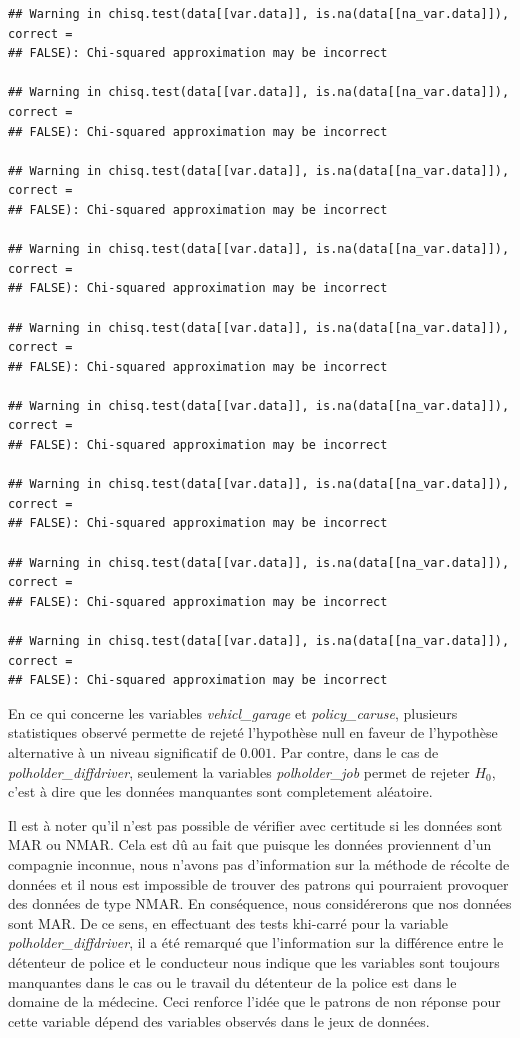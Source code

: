 \documentclass[
]{article}
\begin{document}
\begin{verbatim}
## Warning in chisq.test(data[[var.data]], is.na(data[[na_var.data]]), correct =
## FALSE): Chi-squared approximation may be incorrect

## Warning in chisq.test(data[[var.data]], is.na(data[[na_var.data]]), correct =
## FALSE): Chi-squared approximation may be incorrect

## Warning in chisq.test(data[[var.data]], is.na(data[[na_var.data]]), correct =
## FALSE): Chi-squared approximation may be incorrect

## Warning in chisq.test(data[[var.data]], is.na(data[[na_var.data]]), correct =
## FALSE): Chi-squared approximation may be incorrect

## Warning in chisq.test(data[[var.data]], is.na(data[[na_var.data]]), correct =
## FALSE): Chi-squared approximation may be incorrect

## Warning in chisq.test(data[[var.data]], is.na(data[[na_var.data]]), correct =
## FALSE): Chi-squared approximation may be incorrect

## Warning in chisq.test(data[[var.data]], is.na(data[[na_var.data]]), correct =
## FALSE): Chi-squared approximation may be incorrect

## Warning in chisq.test(data[[var.data]], is.na(data[[na_var.data]]), correct =
## FALSE): Chi-squared approximation may be incorrect

## Warning in chisq.test(data[[var.data]], is.na(data[[na_var.data]]), correct =
## FALSE): Chi-squared approximation may be incorrect
\end{verbatim}

En ce qui concerne les variables \emph{vehicl\_garage} et
\emph{policy\_caruse}, plusieurs statistiques observé permette de rejeté
l'hypothèse null en faveur de l'hypothèse alternative à un niveau
significatif de \(0.001%
\). Par contre, dans le cas de \emph{polholder\_diffdriver}, seulement
la variables \emph{polholder\_job} permet de rejeter \(H_0\), c'est à
dire que les données manquantes sont completement aléatoire.

Il est à noter qu'il n'est pas possible de vérifier avec certitude si
les données sont MAR ou NMAR. Cela est dû au fait que puisque les
données proviennent d'un compagnie inconnue, nous n'avons pas
d'information sur la méthode de récolte de données et il nous est
impossible de trouver des patrons qui pourraient provoquer des données
de type NMAR. En conséquence, nous considérerons que nos données sont
MAR. De ce sens, en effectuant des tests khi-carré pour la variable
\emph{polholder\_diffdriver}, il a été remarqué que l'information sur la
différence entre le détenteur de police et le conducteur nous indique
que les variables sont toujours manquantes dans le cas ou le travail du
détenteur de la police est dans le domaine de la médecine. Ceci renforce
l'idée que le patrons de non réponse pour cette variable dépend des
variables observés dans le jeux de données.
\end{document}
